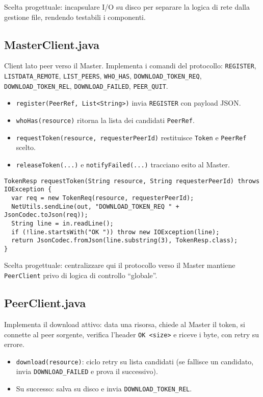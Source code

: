 \documentclass[a4paper,12pt]{article}
\begin{document}
Scelta progettuale: incapsulare I/O su disco per separare la logica di rete dalla gestione file, rendendo testabili i componenti.

\subsection*{MasterClient.java}
Client lato peer verso il Master. Implementa i comandi del protocollo: \texttt{REGISTER}, \texttt{LISTDATA\_REMOTE}, \texttt{LIST\_PEERS}, \texttt{WHO\_HAS}, \texttt{DOWNLOAD\_TOKEN\_REQ}, \texttt{DOWNLOAD\_TOKEN\_REL}, \texttt{DOWNLOAD\_FAILED}, \texttt{PEER\_QUIT}.
\begin{itemize}[nosep]
  \item \texttt{register(PeerRef, List<String>)} invia \texttt{REGISTER} con payload JSON.
  \item \texttt{whoHas(resource)} ritorna la lista dei candidati \texttt{PeerRef}.
  \item \texttt{requestToken(resource, requesterPeerId)} restituisce \texttt{Token} e \texttt{PeerRef} scelto.
  \item \texttt{releaseToken(...)} e \texttt{notifyFailed(...)} tracciano esito al Master.
\end{itemize}

\begin{lstlisting}
TokenResp requestToken(String resource, String requesterPeerId) throws IOException {
  var req = new TokenReq(resource, requesterPeerId);
  NetUtils.sendLine(out, "DOWNLOAD_TOKEN_REQ " + JsonCodec.toJson(req));
  String line = in.readLine();
  if (!line.startsWith("OK ")) throw new IOException(line);
  return JsonCodec.fromJson(line.substring(3), TokenResp.class);
}
\end{lstlisting}

Scelta progettuale: centralizzare qui il protocollo verso il Master mantiene \texttt{PeerClient} privo di logica di controllo “globale”.

\subsection*{PeerClient.java}
Implementa il download attivo: data una risorsa, chiede al Master il token, si connette al peer sorgente, verifica l’header \texttt{OK <size>} e riceve i byte, con retry su errore.
\begin{itemize}[nosep]
  \item \texttt{download(resource)}: ciclo retry su lista candidati (se fallisce un candidato, invia \texttt{DOWNLOAD\_FAILED} e prova il successivo).
  \item Su successo: salva su disco e invia \texttt{DOWNLOAD\_TOKEN\_REL}.
\end{itemize}
\end{document}
